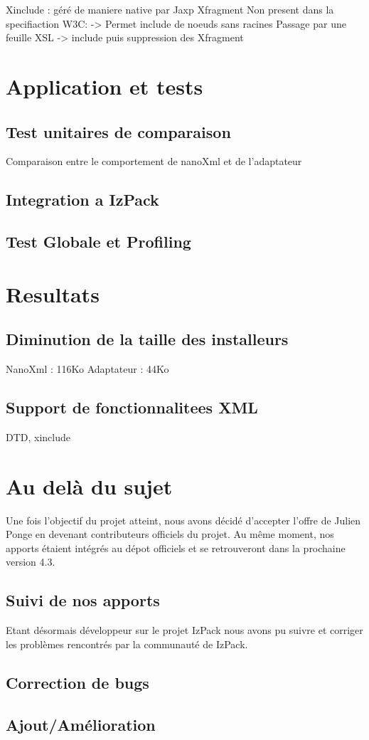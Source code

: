 Xinclude : géré de maniere native par Jaxp
Xfragment Non present dans la specifiaction W3C:
-> Permet include de noeuds sans racines
Passage par une feuille XSL
-> include puis suppression des Xfragment
\section{Application et tests}
\subsection{Test unitaires de comparaison}
Comparaison entre le comportement de nanoXml et de l'adaptateur
\subsection{Integration a IzPack}
\subsection{Test Globale et Profiling}

\section{Resultats}
\subsection{Diminution de la taille des installeurs}
NanoXml : 116Ko
Adaptateur : 44Ko
\subsection{Support de fonctionnalitees XML}
DTD, xinclude

\section{Au delà du sujet}
Une fois l'objectif du projet atteint, nous avons décidé d'accepter l'offre de Julien Ponge en devenant contributeurs officiels du projet. Au même moment, nos apports étaient intégrés au dépot officiels et se retrouveront dans la prochaine version 4.3.

\subsection{Suivi de nos apports}
Etant désormais développeur sur le projet IzPack nous avons pu suivre et corriger les problèmes rencontrés par la communauté de IzPack.

\subsection{Correction de bugs}

\subsection{Ajout/Amélioration}
